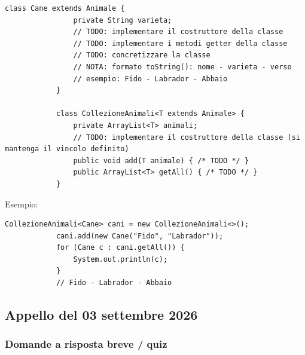 \begin{enumerate}
\begin{lstlisting}[style=java]
			class Cane extends Animale {
				private String varieta;
				// TODO: implementare il costruttore della classe
				// TODO: implementare i metodi getter della classe
				// TODO: concretizzare la classe
				// NOTA: formato toString(): nome - varieta - verso
				// esempio: Fido - Labrador - Abbaio
			}
			
			class CollezioneAnimali<T extends Animale> {
				private ArrayList<T> animali;
				// TODO: implementare il costruttore della classe (si mantenga il vincolo definito)
				public void add(T animale) { /* TODO */ }
				public ArrayList<T> getAll() { /* TODO */ }
			}
		\end{lstlisting}
		
		Esempio:
		\begin{lstlisting}[style=java]
			CollezioneAnimali<Cane> cani = new CollezioneAnimali<>();
			cani.add(new Cane("Fido", "Labrador"));
			for (Cane c : cani.getAll()) {
				System.out.println(c);
			}
			// Fido - Labrador - Abbaio
		\end{lstlisting}
	\end{enumerate}
	
	\subsection{Appello del 03 settembre 2026}
	
	\subsubsection{Domande a risposta breve / quiz}
	
